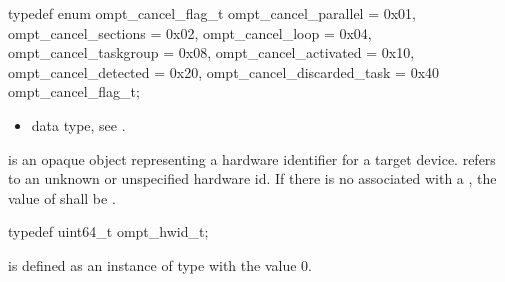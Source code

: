 \begin{ccppspecific}
\begin{omptEnum}
typedef enum ompt_cancel_flag_t {
  ompt_cancel_parallel       = 0x01,
  ompt_cancel_sections       = 0x02,
  ompt_cancel_loop           = 0x04,
  ompt_cancel_taskgroup      = 0x08,
  ompt_cancel_activated      = 0x10,
  ompt_cancel_detected       = 0x20,
  ompt_cancel_discarded_task = 0x40
} ompt_cancel_flag_t;
\end{omptEnum}
\end{ccppspecific}


\crossreferences
\begin{itemize}
\item {} data type, see .
\end{itemize}


\label{sec:ompt_hwid_t}
 is an opaque object representing a hardware identifier for a target device.
\label{sec:ompt_hwid_none}
 refers to an unknown or unspecified hardware id.
If there is no  associated with a
, the value of  shall be
.


\begin{ccppspecific}
\begin{omptOther}
typedef uint64_t ompt_hwid_t;
\end{omptOther}
\end{ccppspecific}

 is defined as an instance of type  with the value 
0.




